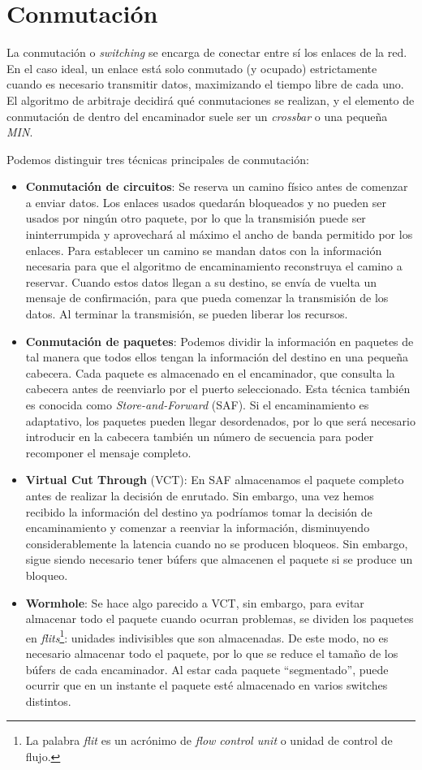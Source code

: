 \section{Conmutación}

La conmutación o \textit{switching} se encarga de conectar entre sí los enlaces de la red. En el caso ideal, un enlace está solo conmutado (y ocupado) estrictamente cuando es necesario transmitir datos, maximizando el tiempo libre de cada uno. El algoritmo de arbitraje decidirá qué conmutaciones se realizan, y el elemento de conmutación de dentro del encaminador suele ser un \textit{crossbar} o una pequeña \textit{MIN}.

Podemos distinguir tres técnicas principales de conmutación:
\begin{itemize}
    \item \textbf{Conmutación de circuitos}: Se reserva un camino físico antes de comenzar a enviar datos. Los enlaces usados quedarán bloqueados y no pueden ser usados por ningún otro paquete, por lo que la transmisión puede ser ininterrumpida y aprovechará al máximo el ancho de banda permitido por los enlaces. Para establecer un camino se mandan datos con la información necesaria para que el algoritmo de encaminamiento reconstruya el camino a reservar. Cuando estos datos llegan a su destino, se envía de vuelta un mensaje de confirmación, para que pueda comenzar la transmisión de los datos. Al terminar la transmisión, se pueden liberar los recursos.
    \item \textbf{Conmutación de paquetes}: Podemos dividir la información en paquetes de tal manera que todos ellos tengan la información del destino en una pequeña cabecera. Cada paquete es almacenado en el encaminador, que consulta la cabecera antes de reenviarlo por el puerto seleccionado. Esta técnica también es conocida como \textit{Store-and-Forward} (SAF). Si el encaminamiento es adaptativo, los paquetes pueden llegar desordenados, por lo que será necesario introducir en la cabecera también un número de secuencia para poder recomponer el mensaje completo.
    \item \textbf{Virtual Cut Through} (VCT): En SAF almacenamos el paquete completo antes de realizar la decisión de enrutado. Sin embargo, una vez hemos recibido la información del destino ya podríamos tomar la decisión de encaminamiento y comenzar a reenviar la información, disminuyendo considerablemente la latencia cuando no se producen bloqueos. Sin embargo, sigue siendo necesario tener búfers que almacenen el paquete si se produce un bloqueo.
    \item \textbf{Wormhole}: Se hace algo parecido a VCT, sin embargo, para evitar almacenar todo el paquete cuando ocurran problemas, se dividen los paquetes en \textit{flits}\footnote{La palabra \textit{flit} es un acrónimo de \textit{flow control unit} o unidad de control de flujo.}: unidades indivisibles que son almacenadas. De este modo, no es necesario almacenar todo el paquete, por lo que se reduce el tamaño de los búfers de cada encaminador. Al estar cada paquete ``segmentado'', puede ocurrir que en un instante el paquete esté almacenado en varios switches distintos.
\end{itemize}

